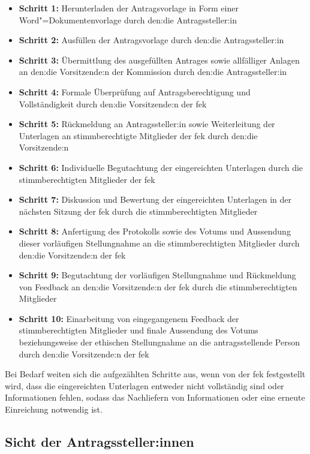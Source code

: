 \documentclass[a4paper,12pt,twoside]{scrreprt}
\begin{document}
\begin{itemize}
    \item \textbf{Schritt 1:} Herunterladen der Antragsvorlage in Form einer Word"=Dokumentenvorlage durch den:die Antragssteller:in
    \item \textbf{Schritt 2:} Ausfüllen der Antragsvorlage durch den:die Antragssteller:in
    \item \textbf{Schritt 3:} Übermittlung des ausgefüllten Antrages sowie allfälliger Anlagen an den:die Vorsitzende:n der Kommission durch den:die Antragssteller:in
    \item \textbf{Schritt 4:} Formale Überprüfung auf Antragsberechtigung und Vollständigkeit durch den:die Vorsitzende:n der \ac{fek}
    \item \textbf{Schritt 5:} Rückmeldung an Antragssteller:in sowie Weiterleitung der Unterlagen an stimmberechtigte Mitglieder der \ac{fek} durch den:die Vorsitzende:n
    \item \textbf{Schritt 6:} Individuelle Begutachtung der eingereichten Unterlagen durch die stimmberechtigten Mitglieder der \ac{fek}
    \item \textbf{Schritt 7:} Diskussion und Bewertung der eingereichten Unterlagen in der nächsten Sitzung der \ac{fek} durch die stimmberechtigten Mitglieder
    \item \textbf{Schritt 8:} Anfertigung des Protokolls sowie des Votums und Aussendung dieser vorläufigen Stellungnahme an die stimmberechtigten Mitglieder durch den:die Vorsitzende:n der \ac{fek}
    \item \textbf{Schritt 9:} Begutachtung der vorläufigen Stellungnahme und Rückmeldung von Feedback an den:die Vorsitzende:n der \ac{fek} durch die stimmberechtigten Mitglieder
    \item \textbf{Schritt 10:} Einarbeitung von eingegangenem Feedback der stimmberechtigten Mitglieder und finale Aussendung des Votums beziehungsweise der ethischen Stellungnahme an die antragsstellende Person durch den:die Vorsitzende:n der \ac{fek}
\end{itemize}

Bei Bedarf weiten sich die aufgezählten Schritte aus, wenn von der \ac{fek} festgestellt wird, dass die eingereichten Unterlagen entweder nicht vollständig sind oder Informationen fehlen, sodass das Nachliefern von Informationen oder eine erneute Einreichung notwendig ist.

\subsection{Sicht der Antragssteller:innen}
\label{sub-sec:sicht-antragssteller}
\end{document}
